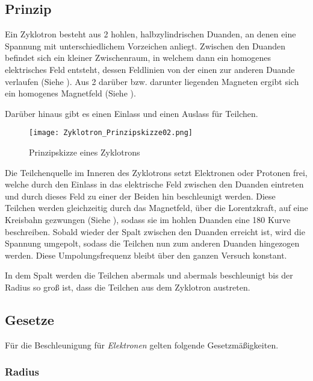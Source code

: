 \subsection{Prinzip} 

Ein Zyklotron besteht aus 2 hohlen, halbzylindrischen Duanden, an denen eine Spannung mit unterschiedlichem Vorzeichen anliegt. Zwischen den Duanden befindet sich ein kleiner Zwischenraum, in welchem dann ein homogenes elektrisches Feld entsteht, dessen Feldlinien von der einen zur anderen Duande verlaufen (Siehe ). Aus 2 darüber bzw. darunter liegenden Magneten ergibt sich ein homogenes Magnetfeld (Siehe ).

Darüber hinaus gibt es einen Einlass und einen Auslass für Teilchen.


\begin{figure}[h!]
	\centering
	\texttt{[image: Zyklotron\_Prinzipskizze02.png]}
	\caption{Prinzipskizze eines Zyklotrons}
	\label{fig:Zyklo}
\end{figure}

Die Teilchenquelle im Inneren des Zyklotrons setzt Elektronen oder Protonen frei, welche durch den Einlass in das elektrische Feld zwischen den Duanden eintreten und durch dieses Feld zu einer der Beiden hin beschleunigt werden. Diese Teilchen werden gleichzeitig durch das Magnetfeld, über die Lorentzkraft, auf eine Kreisbahn gezwungen (Siehe ), sodass sie im hohlen Duanden eine 180\degree{} Kurve beschreiben. Sobald wieder der Spalt zwischen den Duanden erreicht ist, wird die Spannung umgepolt, sodass die Teilchen nun zum anderen Duanden hingezogen werden. Diese Umpolungsfrequenz bleibt über den ganzen Versuch konstant.

In dem Spalt werden die Teilchen abermals und abermals beschleunigt bis der Radius so groß ist, dass die Teilchen aus dem Zyklotron austreten.


\subsection{Gesetze}

Für die Beschleunigung für \emph{Elektronen} gelten folgende Gesetzmäßigkeiten.

\subsubsection{Radius}

